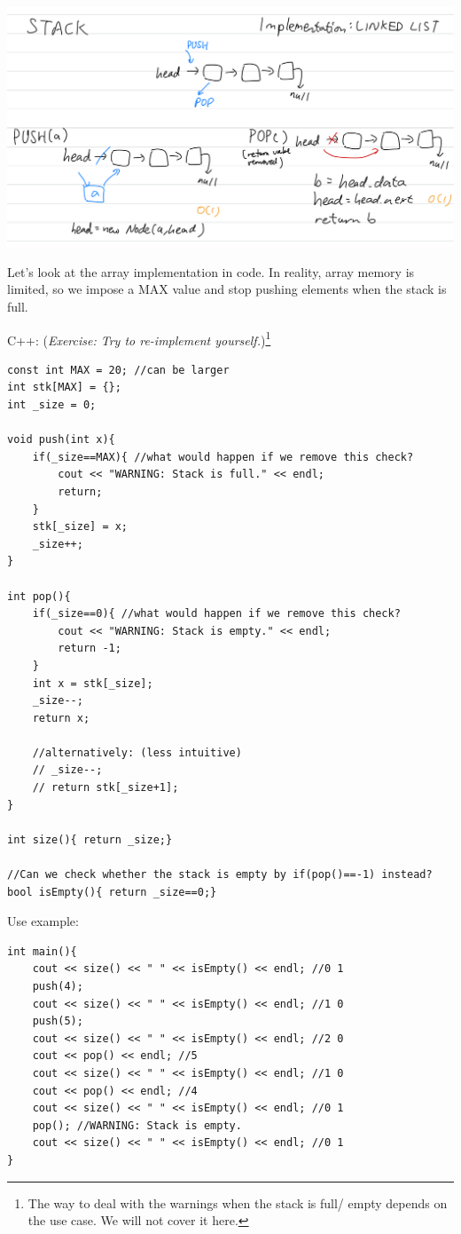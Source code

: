 \includegraphics[width=15cm]{images/ch6-stacklinkedlist.png}

Let's look at the array implementation in code. In reality, array memory is limited, so we impose a MAX value and stop pushing elements when the stack is full.
\vspace{6mm}

C++: (\textit{Exercise: Try to re-implement yourself.})\footnote{The way to deal with the warnings when the stack is full/ empty depends on the use case. We will not cover it here.}
\begin{lstlisting}
const int MAX = 20; //can be larger
int stk[MAX] = {};
int _size = 0;

void push(int x){
    if(_size==MAX){ //what would happen if we remove this check?
        cout << "WARNING: Stack is full." << endl;
        return;
    }
    stk[_size] = x;
    _size++;
}

int pop(){
    if(_size==0){ //what would happen if we remove this check?
        cout << "WARNING: Stack is empty." << endl;
        return -1;
    }
    int x = stk[_size];
    _size--;
    return x;

    //alternatively: (less intuitive)
    // _size--;
    // return stk[_size+1];
}

int size(){ return _size;}

//Can we check whether the stack is empty by if(pop()==-1) instead?
bool isEmpty(){ return _size==0;}
\end{lstlisting}

Use example:
\begin{lstlisting}
int main(){
    cout << size() << " " << isEmpty() << endl; //0 1
    push(4);
    cout << size() << " " << isEmpty() << endl; //1 0
    push(5);
    cout << size() << " " << isEmpty() << endl; //2 0
    cout << pop() << endl; //5
    cout << size() << " " << isEmpty() << endl; //1 0
    cout << pop() << endl; //4
    cout << size() << " " << isEmpty() << endl; //0 1
    pop(); //WARNING: Stack is empty.
    cout << size() << " " << isEmpty() << endl; //0 1
} 
\end{lstlisting}
